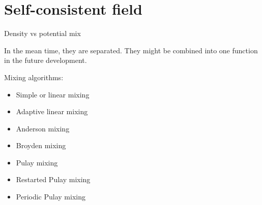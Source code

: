 \section{Self-consistent field}

Density vs potential mix



In the mean time, they are separated. They might be combined into one function
in the future development.

Mixing algorithms:
\begin{itemize}
\item Simple or linear mixing
\item Adaptive linear mixing
\item Anderson mixing
\item Broyden mixing
\item Pulay mixing
\item Restarted Pulay mixing
\item Periodic Pulay mixing
\end{itemize}
